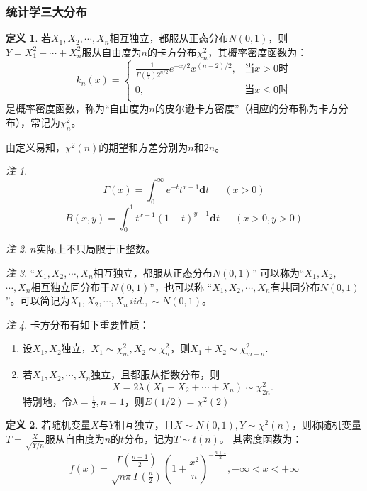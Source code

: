 \documentclass[a4paper,11pt]{article}%
\theoremstyle{remark}
\newtheorem*{remark}{注}
\theoremstyle{remark}
\theoremstyle{definition}
\theoremstyle{definition}
\newtheorem*{definition}{定义}
\theoremstyle{plain}
\begin{document}
\subsubsection{统计学三大分布}
\begin{definition}
    若$X_1,X_2,\cdots,X_n$相互独立，都服从正态分布$N(0,1)$，则$Y=X_1^2+\cdots+X_n^2$服从自由度为$n$的卡方分布$\chi_n^2$，其概率密度函数为：
    \[k_n(x)=
    \begin{cases}
        \frac{1}{\Gamma(\frac{n}{2})2^{n/2}}e^{-x/2}x^{(n-2)/2},&\text{当}x>0\text{时}\\
        0,&\text{当}x\leq 0\text{时}\\
    \end{cases}\]
    是概率密度函数，称为“自由度为$n$的皮尔逊卡方密度”（相应的分布称为卡方分布），常记为$\chi_n^2$。
\end{definition}
由定义易知，$\chi^2(n)$的期望和方差分别为$n$和$2n$。
\begin{remark}
    \[\Gamma(x)=\int_{0}^{\infty}e^{-t}t^{x-1}\mathbf{d}t\phantom{111}(x>0)\]
    \[B(x,y)=\int_{0}^{1}t^{x-1}(1-t)^{y-1}\mathbf{d}t\phantom{111}(x>0,y>0)\]
\end{remark}
\begin{remark}$n$实际上不只局限于正整数。 
\end{remark}
\begin{remark}
   “$X_1,X_2,\cdots,X_n$相互独立，都服从正态分布$N(0,1)$” 可以称为“$X_1,X_2,$\\$\cdots,X_n$相互独立同分布于$N(0,1)$”，也可以称 
   “$X_1,X_2,\cdots,X_n$有共同分布$N(0,1)$”。可以简记为$X_1,X_2,\cdots,X_n\,iid.,\sim N(0,1)$。
\end{remark}
\begin{remark}
    卡方分布有如下重要性质：
    \begin{enumerate}
        \item 设$X_1,X_2$独立，$X_1\sim \chi_m^2,X_2\sim \chi_n^2$，则$X_1+X_2\sim \chi_{m+n}^2.$
        \item 若$X_1,X_2,\cdots,X_n$独立，且都服从指数分布，则
        \[X=2\lambda(X_1+X_2+\cdots+X_n)\sim \chi_{2n}^2.\]
        特别地，令$\lambda=\frac{1}{2},n=1$，则$E(1/2)=\chi^2(2)$
    \end{enumerate}
\end{remark}
\begin{definition}
    若随机变量$X$与$Y$相互独立，且$X\sim N(0,1),Y\sim \chi^2(n)$，则称随机变量$T=\frac{X}{\sqrt{Y/n}}$服从自由度为$n$的$t$分布，记为$T\sim t(n)$。
    其密度函数为：
    \[f(x)=\frac{\Gamma(\frac{n+1}{2})}{\sqrt{n\pi}\Gamma(\frac{n}{2})}(1+\frac{x^2}{n})^{-\frac{n+1}{2}},-\infty<x<+\infty\]
\end{definition}
\end{document}
